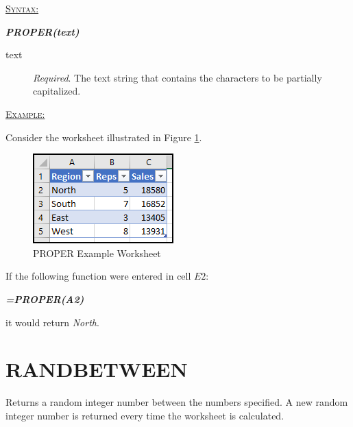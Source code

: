 \begin{addmargin}[1cm]{0cm}
	
	\medskip
	\underline{\textsc{Syntax:}}
	\medskip
	
	{\color{Syntax}
		\noindent\textbf{\textit{PROPER(text)}}
	}
	
	\begin{description}
		\item[text] \textit{Required}. The text string that contains the characters to be partially capitalized.
	\end{description}

	\medskip
	\noindent\underline{\textsc{Example:}}
	\medskip
	
	\noindent Consider the worksheet illustrated in Figure \ref{apa:pro}.
	
	\begin{figure}[H]
		\centering
		\includegraphics[width=\maxwidth{.45\linewidth}]{gfx/apa_fig01}
		\caption{PROPER Example Worksheet}
		\label{apa:pro}
	\end{figure}
	
	\noindent If the following function were entered in cell $ E2 $:
	
	{\color{Syntax}
		\textit{\textbf{=PROPER(A2)}}
	}
	
	\noindent it would return \textit{North}.

\end{addmargin}

\section{RANDBETWEEN}

Returns a random integer number between the numbers specified. A new random integer number is returned every time the worksheet is calculated.

